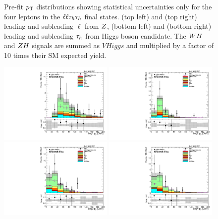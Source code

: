 \begin{figure}[htbp]
     \caption{
Pre-fit $p_\mathrm{T}$ distributions showing statistical uncertainties only for the 
four leptons in the $\ell\ell\tau_{h}\tau_{h}$ final states.
(top left) and (top right) leading and subleading $\ell$ from $Z$,
(bottom left) and (bottom right) leading and subleading $\tau_{h}$ from Higgs boson candidate.
The $WH$ and $ZH$ signals are summed as $VHiggs$ and multiplied by a factor of
10 times their SM expected yield.
     }
     \label{fig:lltt_pts}
\end{figure}

\begin{figure}[htbp]
\centering
     \includegraphics[width=0.49\textwidth]{higgs_to_taus_vh/plots/zh/fr_OS_control/LLEM/pt_1.pdf}
     \includegraphics[width=0.49\textwidth]{higgs_to_taus_vh/plots/zh/fr_OS_control/LLEM/pt_2.pdf}
     \includegraphics[width=0.49\textwidth]{higgs_to_taus_vh/plots/zh/fr_OS_control/LLEM/pt_3.pdf}
     \includegraphics[width=0.49\textwidth]{higgs_to_taus_vh/plots/zh/fr_OS_control/LLEM/pt_4.pdf}

\end{figure}
